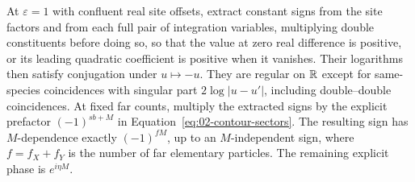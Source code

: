 \begin{lemma}\label{lem:02-sector-signs}
At $\varepsilon=1$ with confluent real site offsets, extract constant
signs from the site factors and from each full pair of integration
variables, multiplying double constituents before doing so, so that
the value at zero real difference is positive, or its leading
quadratic coefficient is positive when it vanishes. Their logarithms
then satisfy conjugation under $u\mapsto-u$. They are regular on
$\mathbb R$ except for same-species coincidences with singular part
$2\log|u-u'|$, including double--double coincidences.
At fixed far counts, multiply the extracted signs by the explicit
prefactor $(-1)^{sb+M}$ in Equation~\eqref{eq:02-contour-sectors}.
The resulting sign has $M$-dependence exactly $(-1)^{fM}$, up to an
$M$-independent sign, where $f=f_X+f_Y$ is the number of far elementary
particles. The remaining explicit phase is $e^{i\eta M}$.
\end{lemma}
